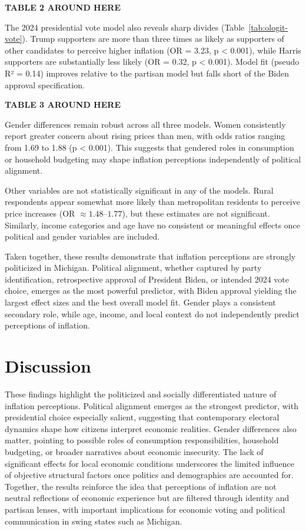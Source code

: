 \documentclass[preprint,12pt,authoryear]{elsarticle}
\begin{document}
\begin{center}
\textbf{TABLE 2 AROUND HERE}
\end{center}

The 2024 presidential vote model also reveals sharp divides (Table~\ref{tab:ologit-vote}). Trump supporters are more than three times as likely as supporters of other candidates to perceive higher inflation (OR = 3.23, p < 0.001), while Harris supporters are substantially less likely (OR = 0.32, p < 0.001). Model fit (pseudo R² = 0.14) improves relative to the partisan model but falls short of the Biden approval specification.

\begin{center}
\textbf{TABLE 3 AROUND HERE}
\end{center}

Gender differences remain robust across all three models. Women consistently report greater concern about rising prices than men, with odds ratios ranging from 1.69 to 1.88 (p < 0.001). This suggests that gendered roles in consumption or household budgeting may shape inflation perceptions independently of political alignment.

Other variables are not statistically significant in any of the models. Rural respondents appear somewhat more likely than metropolitan residents to perceive price increases (OR $\approx 1.48$--$1.77$), but these estimates are not significant. Similarly, income categories and age have no consistent or meaningful effects once political and gender variables are included.

Taken together, these results demonstrate that inflation perceptions are strongly politicized in Michigan. Political alignment, whether captured by party identification, retrospective approval of President Biden, or intended 2024 vote choice, emerges as the most powerful predictor, with Biden approval yielding the largest effect sizes and the best overall model fit. Gender plays a consistent secondary role, while age, income, and local context do not independently predict perceptions of inflation.


\section{Discussion}
These findings highlight the politicized and socially differentiated nature of inflation perceptions. Political alignment emerges as the strongest predictor, with presidential choice especially salient, suggesting that contemporary electoral dynamics shape how citizens interpret economic realities. Gender differences also matter, pointing to possible roles of consumption responsibilities, household budgeting, or broader narratives about economic insecurity. The lack of significant effects for local economic conditions underscores the limited influence of objective structural factors once politics and demographics are accounted for. Together, the results reinforce the idea that perceptions of inflation are not neutral reflections of economic experience but are filtered through identity and partisan lenses, with important implications for economic voting and political communication in swing states such as Michigan.
\end{document}
